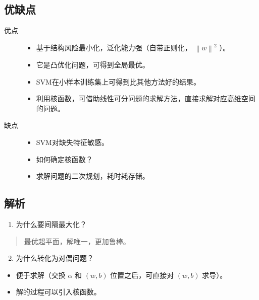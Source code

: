 \documentclass[letterpaper,10pt,english]{sphinxmanual}
\begin{document}
\subsection{优缺点}
\label{\detokenize{machineLearning/02_svm:id4}}\begin{description}
\item[{优点}] \leavevmode\begin{itemize}
\item {} 
基于结构风险最小化，泛化能力强（自带正则化， \(\left \| w \right \|^2\) ）。

\item {} 
它是凸优化问题，可得到全局最优。

\item {} 
SVM在小样本训练集上可得到比其他方法好的结果。

\item {} 
利用核函数，可借助线性可分问题的求解方法，直接求解对应高维空间的问题。

\end{itemize}

\item[{缺点}] \leavevmode\begin{itemize}
\item {} 
SVM对缺失特征敏感。

\item {} 
如何确定核函数？

\item {} 
求解问题的二次规划，耗时耗存储。

\end{itemize}

\end{description}


\subsection{解析}
\label{\detokenize{machineLearning/02_svm:id5}}\begin{enumerate}
\item {} 
为什么要间隔最大化？

\end{enumerate}
\begin{quote}

最优超平面，解唯一，更加鲁棒。
\end{quote}
\begin{enumerate}
\setcounter{enumi}{1}
\item {} 
为什么转化为对偶问题？

\end{enumerate}
\begin{itemize}
\item {} 
便于求解（交换 \(\alpha\) 和 \((w,b)\) 位置之后，可直接对 \((w,b)\) 求导）。

\item {} 
解的过程可以引入核函数。

\end{itemize}
\end{document}
